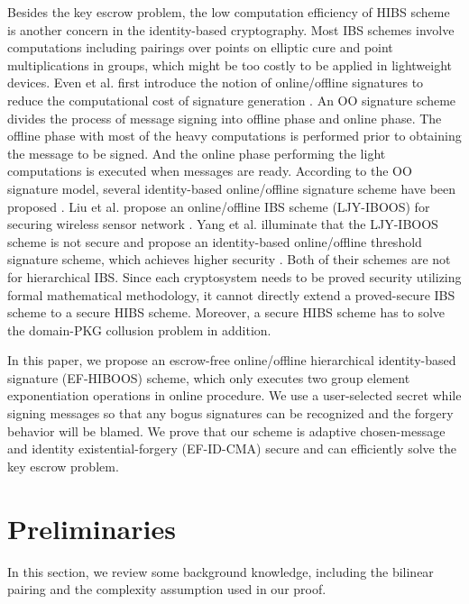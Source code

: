 \documentclass[times]{secauth}
\theoremstyle{definition}
\theoremstyle{remark}
\begin{document}
Besides the key escrow problem, the low computation efficiency of HIBS scheme is another concern in the identity-based cryptography.
Most IBS schemes involve computations including pairings over points on elliptic cure and point multiplications in groups, which might be too costly to be applied in lightweight devices.
Even et al. first introduce the notion of online/offline signatures to reduce the computational cost of signature generation \cite{even1990line}.
An OO signature scheme divides the process of message signing into offline phase and online phase.
The offline phase with most of the heavy computations is performed prior to obtaining the message to be signed.
And the online phase performing the light computations is executed when messages are ready. 
According to the OO signature model, several identity-based online/offline signature scheme have been proposed \cite{liu2011online,yasmin2010authentication,liu2010efficient,kar2014provably}.
Liu et al. propose an online/offline IBS scheme (LJY-IBOOS) for securing wireless sensor network \cite{liu2010efficient}.
Yang et al. illuminate that the LJY-IBOOS scheme is not secure and propose an identity-based online/offline threshold signature scheme, which achieves higher security \cite{yang2013id}.
Both of their schemes are not for hierarchical IBS.
Since each cryptosystem needs to be proved security utilizing formal mathematical methodology, it cannot directly extend a proved-secure IBS scheme to a secure HIBS scheme.
Moreover, a secure HIBS scheme has to solve the domain-PKG collusion problem in addition.
\par

In this paper, we propose an escrow-free online/offline hierarchical identity-based signature (EF-HIBOOS) scheme, which only executes two group element exponentiation operations in online procedure. 
We use a user-selected secret while signing messages so that any bogus signatures can be recognized and the forgery behavior will be blamed. 
We prove that our scheme is adaptive chosen-message and identity existential-forgery (EF-ID-CMA) secure and can efficiently solve the key escrow problem.
\par

\section{Preliminaries}\label{sec-Pre}
In this section, we review some background knowledge, including the bilinear pairing and the complexity assumption used in our proof. 
\end{document}
